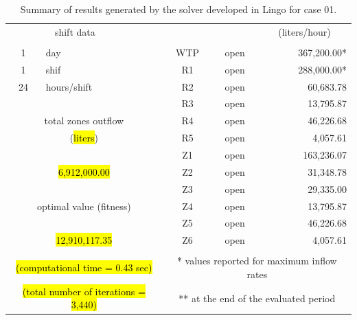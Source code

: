 \documentclass{singlecol}
\theoremstyle{TH}{
\newtheorem{lemma}{Lemma}
\newtheorem{theorem}[lemma]{Theorem}
\newtheorem{corrolary}[lemma]{Corrolary}
\newtheorem{conjecture}[lemma]{Conjecture}
\newtheorem{proposition}[lemma]{Proposition}
\newtheorem{claim}[lemma]{Claim}
\newtheorem{stheorem}[lemma]{Wrong Theorem}
\newtheorem{algorithm}{Algorithm}
}
\theoremstyle{THrm}{
\newtheorem{definition}{Definition}[section]
\newtheorem{question}{Question}[section]
\newtheorem{remark}{Remark}
\newtheorem{scheme}{Scheme}
}
\theoremstyle{THhit}{
\newtheorem{case}{Case}[section]
}
\begin{document}
\begin{table}[h!]
\begin{center}
\begin{small}
\begin{tabular}{ c r r r r r }
		\multicolumn{2}{c}{shift data}     &   &      & \multicolumn{1}{c}{} & \multicolumn{1}{c}{(liters/hour)} \\
		   \\
		1   &  \multicolumn{1}{l}{day}   &              		& \multicolumn{1}{c}{WTP}    & \multicolumn{1}{c}{open} &  367,200.00* \\
		1   &  \multicolumn{1}{l}{shif}  &         			    & \multicolumn{1}{c}{R1}     & \multicolumn{1}{c}{open} &  288,000.00* \\
		24  &  \multicolumn{1}{l}{hours/shift}        &         & \multicolumn{1}{c}{R2}     & \multicolumn{1}{c}{open} &    60,683.78 \\
	   &      &              									& \multicolumn{1}{c}{R3}     & \multicolumn{1}{c}{open} &    13,795.87 \\
	   \multicolumn{3}{c}{total zones outflow}                  & \multicolumn{1}{c}{R4}     & \multicolumn{1}{c}{open} &    46,226.68 \\
	   \multicolumn{3}{c}{(\hl{liters})}              			& \multicolumn{1}{c}{R5}     & \multicolumn{1}{c}{open} &     4,057.61 \\
	   &      &              									& \multicolumn{1}{c}{Z1}     & \multicolumn{1}{c}{open} &   163,236.07 \\
	   \multicolumn{3}{c}{\hl{6,912,000.00}}              			& \multicolumn{1}{c}{Z2}     & \multicolumn{1}{c}{open} &    31,348.78 \\
	      &              &              						& \multicolumn{1}{c}{Z3}     & \multicolumn{1}{c}{open} &    29,335.00 \\
	   \multicolumn{3}{c}{optimal value (fitness)}              & \multicolumn{1}{c}{Z4}     & \multicolumn{1}{c}{open} &    13,795.87 \\
	   &             &             						 		& \multicolumn{1}{c}{Z5}     & \multicolumn{1}{c}{open} &    46,226.68 \\
	   \multicolumn{3}{c}{\hl{12,910,117.35}}              			& \multicolumn{1}{c}{Z6}     & \multicolumn{1}{c}{open} &     4,057.61 \\
	   \\
	   \multicolumn{3}{c}{\hl{(computational time  = 0.43 sec)}}     & \multicolumn{3}{c}{* values reported for maximum inflow rates} \\
	   \multicolumn{3}{c}{\hl{(total number of iterations = 3,440)}}   & \multicolumn{3}{c}{** at the end of the evaluated period} 
	\end{tabular}
		\end{small}
\caption{Summary of results generated by the solver developed in Lingo for case 01.}
\label{tab:lingoEvalCase01}
\end{center}
\end{table}
\end{document}
